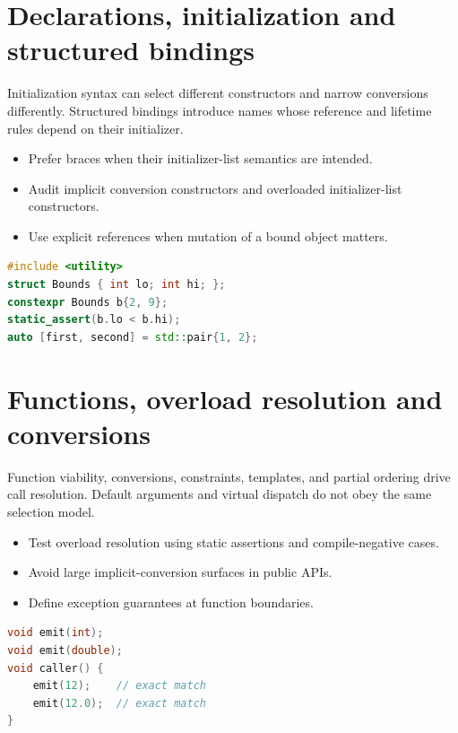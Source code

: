 \documentclass[11pt]{article}
\begin{document}
\section{Declarations, initialization and structured bindings}
Initialization syntax can select different constructors and narrow conversions differently. Structured bindings introduce names whose reference and lifetime rules depend on their initializer.

\begin{itemize}[leftmargin=*,itemsep=1pt,topsep=3pt]
\item Prefer braces when their initializer-list semantics are intended.
\item Audit implicit conversion constructors and overloaded initializer-list constructors.
\item Use explicit references when mutation of a bound object matters.
\end{itemize}
\begin{lstlisting}[language=C++]
#include <utility>
struct Bounds { int lo; int hi; };
constexpr Bounds b{2, 9};
static_assert(b.lo < b.hi);
auto [first, second] = std::pair{1, 2};
\end{lstlisting}
\section{Functions, overload resolution and conversions}
Function viability, conversions, constraints, templates, and partial ordering drive call resolution. Default arguments and virtual dispatch do not obey the same selection model.

\begin{itemize}[leftmargin=*,itemsep=1pt,topsep=3pt]
\item Test overload resolution using static assertions and compile-negative cases.
\item Avoid large implicit-conversion surfaces in public APIs.
\item Define exception guarantees at function boundaries.
\end{itemize}
\begin{lstlisting}[language=C++]
void emit(int);
void emit(double);
void caller() {
    emit(12);    // exact match
    emit(12.0);  // exact match
}
\end{lstlisting}
\end{document}
